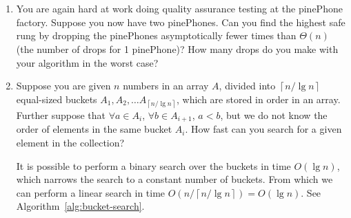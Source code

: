 \documentclass[letterpaper,11pt]{article}
\newif\ifSolutions
\begin{document}
\thispagestyle{plain}


 \\

 \\

\begin{enumerate}
\item You are again hard at work doing quality assurance testing at the pinePhone factory. Suppose you now have two pinePhones. Can you find the highest safe rung by dropping the pinePhones asymptotically fewer times than $\Theta(n)$ (the number of drops for 1 pinePhone)? How many drops do you make with your algorithm in the worst case?\\

\ifSolutions
We can decompose the ladder into $\sqrt{n}$ sections, each of which has $\sqrt{n}$ rungs. We drop the first pinePhone from the bottommost rung, then drop from rungs $i\sqrt{n}$ for $i=1,2,3,\ldots \sqrt{n}$ until the pinePhone breaks. When it breaks, we are guaranteed that highest safe rung is within the $\sqrt{n}$ rungs below where the first pinePhone broke. We then test each one of the rungs from bottom to top using the iterative algorithm for one pinePhone. In total, we perform $2\sqrt{n}-1=\Theta(\sqrt{n})$ drops in the worst case.
\else
\vspace*{6cm}
\fi{}

\item Suppose you are given $n$ numbers in an array $A$, divided into $\left\lceil n/\lg n \right\rceil$ equal-sized buckets $A_1,A_2,\ldots A_{\left\lceil n/\lg n\right\rceil}$, which are stored in order in an array. Further suppose that $\forall a\in A_i$, $\forall b\in A_{i+1}$, $a<b$, but we do not know the order of elements in the same bucket $A_i$. How fast can you search for a given element in the collection?

\ifSolutions
It is possible to perform a binary search over the buckets in time $O(\lg n)$, which narrows the search to a constant number of buckets. From which we can perform a linear search in time $O(n/\left\lceil n/\lg n\right\rceil) = O(\lg n)$. See Algorithm~\ref{alg:bucket-search}.


\end{enumerate}
\end{document}
